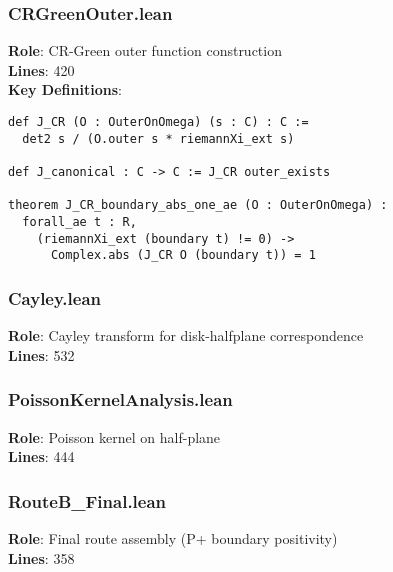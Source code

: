 \documentclass[12pt,a4paper]{article}
\begin{document}
\subsubsection{CRGreenOuter.lean}
\textbf{Role}: CR-Green outer function construction\\
\textbf{Lines}: 420\\
\textbf{Key Definitions}:
\begin{lstlisting}[language=Lean]
def J_CR (O : OuterOnOmega) (s : C) : C :=
  det2 s / (O.outer s * riemannXi_ext s)

def J_canonical : C -> C := J_CR outer_exists

theorem J_CR_boundary_abs_one_ae (O : OuterOnOmega) :
  forall_ae t : R,
    (riemannXi_ext (boundary t) != 0) ->
      Complex.abs (J_CR O (boundary t)) = 1
\end{lstlisting}

\subsubsection{Cayley.lean}
\textbf{Role}: Cayley transform for disk-halfplane correspondence\\
\textbf{Lines}: 532

\subsubsection{PoissonKernelAnalysis.lean}
\textbf{Role}: Poisson kernel on half-plane\\
\textbf{Lines}: 444

\subsubsection{RouteB\_Final.lean}
\textbf{Role}: Final route assembly (P+ boundary positivity)\\
\textbf{Lines}: 358
\end{document}
